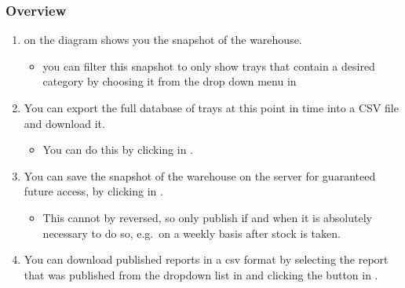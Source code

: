\documentclass[letterpaper,10pt,english]{sphinxmanual}
\begin{document}
\subsubsection{Overview}
\label{\detokenize{docs/ui/reports:overview}}\begin{enumerate}
%
\item {} 
 on the diagram shows you the snapshot of the warehouse.
\begin{itemize}
\item {} 
you can filter this snapshot to only show trays that contain a
desired category by choosing it from the drop down menu in

\end{itemize}

\item {} 
You can export the full database of trays at this point in time into
a CSV file and download it.
\begin{itemize}
\item {} 
You can do this by clicking  in .

\end{itemize}

\item {} 
You can save the snapshot of the warehouse on the server for
guaranteed future access, by clicking  in
.
\begin{itemize}
\item {} 
This cannot by reversed, so only publish if and when it is
absolutely necessary to do so, e.g. on a weekly basis after stock
is taken.

\end{itemize}

\item {} 
You can download published reports in a csv format by selecting the
report that was published from the dropdown list in
 and clicking the  button in
.

\end{enumerate}
\end{document}
